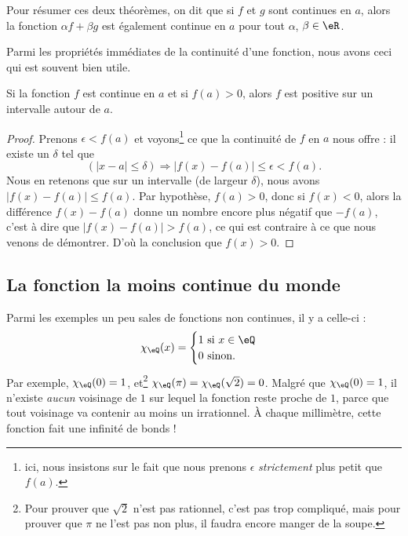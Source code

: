 Pour résumer ces deux théorèmes, on dit que si $f$ et $g$ sont continues en $a$, alors la fonction $\alpha f+\beta g$ est également continue en $a$ pour tout $\alpha$, $\beta\in\eR$.

Parmi les propriétés immédiates de la continuité d'une fonction, nous avons ceci qui est souvent bien utile.

\begin{corollary}   \label{CorNNPYooMbaYZg}
Si la fonction $f$ est continue en $a$ et si $f(a)>0$, alors $f$ est positive sur un intervalle autour de $a$.
\end{corollary}

\begin{proof}
Prenons $\epsilon<f(a)$ et voyons\footnote{ici, nous insistons sur le fait que nous prenons $\epsilon$ \emph{strictement} plus petit que $f(a)$.} ce que la continuité de $f$ en $a$ nous offre : il existe un $\delta$ tel que
\[ 
  (| x-a |\leq \delta)\Rightarrow | f(x)-f(a) |\leq\epsilon < f(a).
\]
Nous en retenons que sur un intervalle (de largeur $\delta$), nous avons $| f(x)-f(a) |\leq f(a)$. Par hypothèse, $f(a)>0$, donc si $f(x)<0$, alors la différence $f(x)-f(a)$ donne un nombre encore plus négatif que $-f(a)$, c'est à dire que $| f(x)-f(a) |>f(a)$, ce qui est contraire à ce que nous venons de démontrer. D'où la conclusion que $f(x)>0$.
\end{proof}

\subsection{La fonction la moins continue du monde}

Parmi les exemples un peu sales de fonctions non continues, il y a celle-ci :
\[ 
  \chi_{\eQ}(x)=
\begin{cases}
    1 \text{ si $x\in\eQ$}\\
    0 \text{ sinon.}
\end{cases}
\]
Par exemple, $\chi_{\eQ}(0)=1$, et\footnote{Pour prouver que $\sqrt{2}$ n'est pas rationnel, c'est pas trop compliqué, mais pour prouver que $\pi$ ne l'est pas non plus, il faudra encore manger de la soupe.} $\chi_{\eQ}(\pi)=\chi_{\eQ}(\sqrt{2})=0$. Malgré que $\chi_{\eQ}(0)=1$, il n'existe \emph{aucun} voisinage de $1$ sur lequel la fonction reste proche de $1$, parce que tout voisinage va contenir au moins un irrationnel. À chaque millimètre, cette fonction fait une infinité de bonds !


